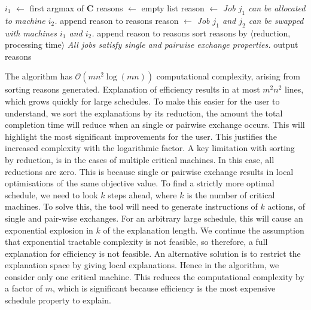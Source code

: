 \begin{algorithm}[H]
	\caption{}
	\begin{algorithmic}[1]
						\State $i_1$ $\gets$ first argmax of $\mathbf{C}$
			\State reasons $\gets$ empty list
						\State reason $\gets$ \emph{Job $j_1$ can be allocated to machine $i_2$.}
						\State append reason to reasons
					\EndIf
							\State reason $\gets$ \emph{Job $j_1$ and $j_2$ can be swapped with machines $i_1$ and $i_2$.}
							\State append reason to reasons
						\EndIf
					\EndFor
				\EndFor
			\EndFor
			\State sort reasons by $\langle$reduction, processing time$\rangle$
				\State\emph{All jobs satisfy single and pairwise exchange properties.}
			\Else
				\State output reasons
			\EndIf
		\EndFunction
	\end{algorithmic}
\end{algorithm}

The algorithm has $\mathcal{O}(mn^2\log(mn))$ computational complexity, arising from sorting reasons generated. Explanation of efficiency results in at most $m^2n^2$ lines, which  grows quickly for large schedules. To make this easier for the user to understand, we sort the explanations by its reduction, the amount the total completion time will reduce when an  single or pairwise exchange occurs. This will highlight the most significant improvements for the user. This justifies the increased complexity with the logarithmic factor.
\linespace
A key limitation with sorting by reduction, is in the cases of multiple critical machines. In this case, all reductions are zero. This is because single or pairwise exchange results in local optimisations of the same objective value. To find a strictly more optimal schedule, we need to look $k$ steps ahead, where $k$ is the number of critical machines. To solve this, the tool will need to generate instructions of $k$ actions, of single and pair-wise exchanges. For an arbitrary large schedule, this will cause an exponential explosion in $k$ of the explanation length. We continue the assumption that exponential tractable complexity is not feasible, so therefore, a full explanation for efficiency is not feasible.
\linespace
An alternative solution is to restrict the explanation space by giving local explanations. Hence in the algorithm, we consider only one critical machine. This reduces the computational complexity by a factor of $m$, which is significant because efficiency is the most expensive schedule property to explain.

